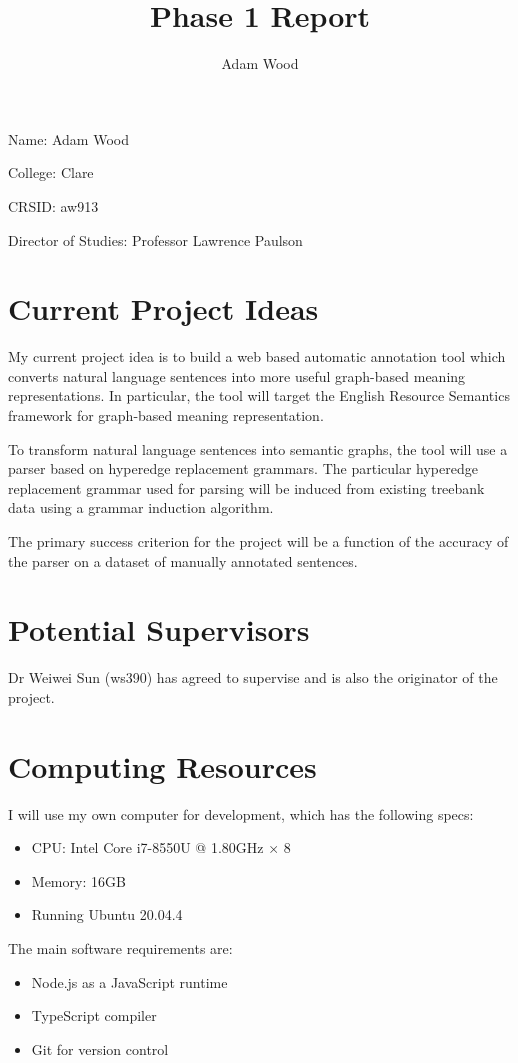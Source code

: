 \documentclass[11pt]{article}
\title{Phase 1 Report}
\author{Adam Wood}
\begin{document}
\maketitle

Name: Adam Wood

College: Clare

CRSID: aw913

Director of Studies: Professor Lawrence Paulson

\section{Current Project Ideas}

My current project idea is to build a web based automatic annotation tool which converts natural language sentences into more useful graph-based meaning representations. In particular, the tool will target the English Resource Semantics framework for graph-based meaning representation. 

To transform natural language sentences into semantic graphs, the tool will use a parser based on hyperedge replacement grammars. The particular hyperedge replacement grammar used for parsing will be induced from existing treebank data using a grammar induction algorithm. 

The primary success criterion for the project will be a function of the accuracy of the parser on a dataset of manually annotated sentences.

\section{Potential Supervisors}

Dr Weiwei Sun (ws390) has agreed to supervise and is also the originator of the project.

\section{Computing Resources}

I will use my own computer for development, which has the following specs: 
\begin{itemize}
\item CPU: Intel Core i7-8550U @ 1.80GHz × 8 
\item Memory: 16GB
\item Running Ubuntu 20.04.4
\end{itemize}

The main software requirements are:

\begin{itemize}
\item Node.js as a JavaScript runtime
\item TypeScript compiler
\item Git for version control
\end{itemize}
\end{document}
